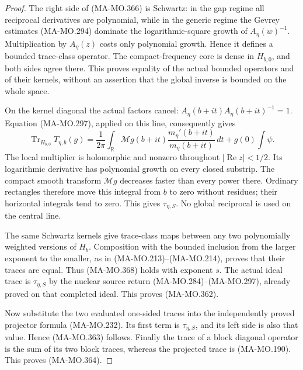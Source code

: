 \begin{proof}
The right side of (MA-MO.366) is Schwartz: in the gap regime
all reciprocal derivatives are polynomial, while in the
generic regime the Gevrey estimates (MA-MO.294) dominate
the logarithmic-square growth of \(A_\eta(w)^{-1}\).
Multiplication by \(A_\eta(z)\) costs only polynomial
growth.  Hence it defines a bounded trace-class operator.
The compact-frequency core is dense in \(H_{b,0}\), and
both sides agree there.  This proves equality of the actual
bounded operators and of their kernels, without an assertion
that the global inverse is bounded on the whole space.

On the kernel diagonal the actual factors cancel:
\(A_\eta(b+it)A_\eta(b+it)^{-1}=1\).
Equation (MA-MO.297), applied on this line, consequently gives
\[
 \operatorname{Tr}_{H_{b,0}}T_{\eta,b}(g)
   =\frac1{2\pi}\int_{\mathbb R}
      \mathcal Mg(b+it)\frac{m_\eta'(b+it)}{m_\eta(b+it)}\,dt
                              +g(0)\int\psi.
 \tag{MA-MO.368}
\]
The local multiplier is holomorphic and nonzero throughout
\(|\operatorname{Re}z|<1/2\).  Its logarithmic derivative
has polynomial growth on every closed substrip.  The compact
smooth transform \(\mathcal Mg\) decreases faster than
every power there.  Ordinary rectangles therefore move this
integral from \(b\) to zero without residues; their horizontal
integrals tend to zero.  This gives \(\tau_{\eta,S}\).
No global reciprocal is used on the central line.

The same Schwartz kernels give trace-class maps between any
two polynomially weighted versions of \(H_b\).  Composition
with the bounded inclusion from the larger exponent to the
smaller, as in (MA-MO.213)--(MA-MO.214), proves that their
traces are equal.  Thus (MA-MO.368) holds with exponent \(s\).
The actual ideal trace is \(\tau_{\eta,S}\) by the nuclear
source return (MA-MO.284)--(MA-MO.297), already proved on
that completed ideal.  This proves (MA-MO.362).

Now substitute the two evaluated one-sided traces into the
independently proved projector formula (MA-MO.232).  Its first
term is \(\tau_{\eta,S}\), and its left side is also that
value.  Hence (MA-MO.363) follows.  Finally the trace of a
block diagonal operator is the sum of its two block traces,
whereas the projected trace is (MA-MO.190).  This proves
(MA-MO.364).
\end{proof}

